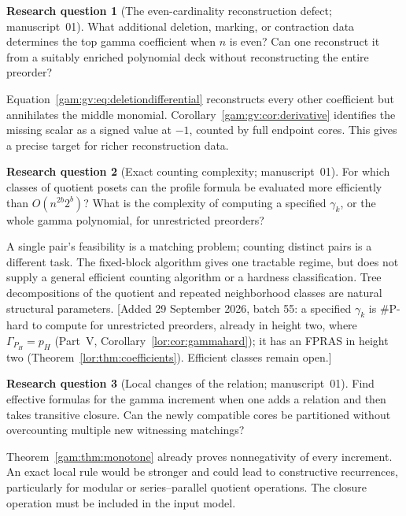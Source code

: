 \documentclass[11pt]{article}
\numberwithin{equation}{section}
\theoremstyle{definition}
\newtheorem{question}{Research question}%
\begin{document}
\begin{question}[The even-cardinality reconstruction defect; manuscript~01]
What additional deletion, marking, or contraction data determines the top
gamma coefficient when $n$ is even? Can one reconstruct it from a suitably
enriched polynomial deck without reconstructing the entire preorder?
\end{question}
Equation~\eqref{gam:gv:eq:deletiondifferential} reconstructs every other
coefficient but annihilates the middle monomial.
Corollary~\ref{gam:gv:cor:derivative} identifies the missing scalar as a
signed value at $-1$, counted by full endpoint cores. This gives a precise
target for richer reconstruction data.

\begin{question}[Exact counting complexity; manuscript~01]\label{lor:hq:countcx}%
For which classes of quotient posets can the profile formula be evaluated
more efficiently than $O(n^{2b}2^b)$? What is the complexity of computing a
specified $\gamma_k$, or the whole gamma polynomial, for unrestricted preorders?
\end{question}
A single pair's feasibility is a matching problem; counting distinct pairs
is a different task. The fixed-block algorithm gives one tractable regime,
but does not supply a general efficient counting algorithm or a hardness
classification. Tree decompositions of the quotient and repeated
neighborhood classes are natural structural parameters.
[Added 29 September 2026, batch 55: a specified $\gamma_k$ is
$\#\mathrm P$-hard to compute for unrestricted preorders, already in height
two, where $\Gamma_{P_H}=p_H$ (Part~V, Corollary~\ref{lor:cor:gammahard}); it
has an FPRAS in height two (Theorem~\ref{lor:thm:coefficients}). Efficient
classes remain open.]

\begin{question}[Local changes of the relation; manuscript~01]
Find effective formulas for the gamma increment when one adds a relation
and then takes transitive closure. Can the newly compatible cores be
partitioned without overcounting multiple new witnessing matchings?
\end{question}
Theorem~\ref{gam:thm:monotone} already proves nonnegativity of every increment.
An exact local rule would be stronger and could lead to constructive
recurrences, particularly for modular or series--parallel quotient
operations. The closure operation must be included in the input model.
\end{document}
